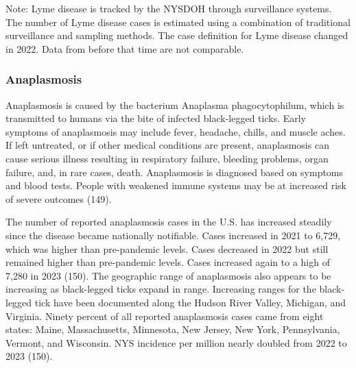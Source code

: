 \documentclass[
  english,
  letterpaper,
]{report}
\begin{document}
\begin{tcolorbox}[enhanced jigsaw, breakable, leftrule=.75mm, title=\textcolor{quarto-callout-note-color}{\faInfo}\hspace{0.5em}{Note}, bottomrule=.15mm, opacityback=0, left=2mm, colback=white, bottomtitle=1mm, coltitle=black, colbacktitle=quarto-callout-note-color!10!white, colframe=quarto-callout-note-color-frame, opacitybacktitle=0.6, toptitle=1mm, titlerule=0mm, arc=.35mm, rightrule=.15mm, toprule=.15mm]

Note: Lyme disease is tracked by the NYSDOH through surveillance
systems. The number of Lyme disease cases is estimated using a
combination of traditional surveillance and sampling methods. The case
definition for Lyme disease changed in 2022. Data from before that time
are not comparable.

\end{tcolorbox}

\subsubsection{Anaplasmosis}\label{anaplasmosis}

Anaplasmosis is caused by the bacterium Anaplasma phagocytophilum, which
is transmitted to humans via the bite of infected black-legged ticks.
Early symptoms of anaplasmosis may include fever, headache, chills, and
muscle aches. If left untreated, or if other medical conditions are
present, anaplasmosis can cause serious illness resulting in respiratory
failure, bleeding problems, organ failure, and, in rare cases, death.
Anaplasmosis is diagnosed based on symptoms and blood tests. People with
weakened immune systems may be at increased risk of severe outcomes
(149).

The number of reported anaplasmosis cases in the U.S. has increased
steadily since the disease became nationally notifiable. Cases increased
in 2021 to 6,729, which was higher than pre-pandemic levels. Cases
decreased in 2022 but still remained higher than pre-pandemic levels.
Cases increased again to a high of 7,280 in 2023 (150). The geographic
range of anaplasmosis also appears to be increasing as black-legged
ticks expand in range. Increasing ranges for the black-legged tick have
been documented along the Hudson River Valley, Michigan, and Virginia.
Ninety percent of all reported anaplasmosis cases came from eight
states: Maine, Massachusetts, Minnesota, New Jersey, New York,
Pennsylvania, Vermont, and Wisconsin. NYS incidence per million nearly
doubled from 2022 to 2023 (150).
\end{document}
